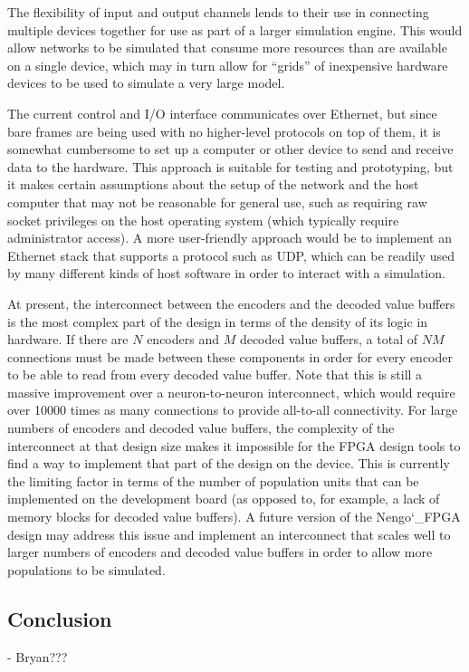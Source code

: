 \documentclass[english]{article}
\newcommand{\design}{Nengo\char`_FPGA}  %
\begin{document}
The flexibility of input and output channels lends to their use in connecting multiple devices together for use as part of a larger simulation engine.
This would allow networks to be simulated that consume more resources than are available on a single device, which may in turn allow
for ``grids'' of inexpensive hardware devices to be used to simulate a very large model.

The current control and I/O interface communicates over Ethernet, but since bare frames are being used with no higher-level protocols on top of them,
it is somewhat cumbersome to set up a computer or other device to send and receive data to the hardware.
This approach is suitable for testing and prototyping, but it makes certain assumptions about the setup of the network and the host computer that
may not be reasonable for general use, such as requiring raw socket privileges on the host operating system (which typically require administrator access).
A more user-friendly approach would be to implement an Ethernet stack that supports a protocol such as UDP, which can be readily used by many different
kinds of host software in order to interact with a simulation.

At present, the interconnect between the encoders and the decoded value
buffers is the most complex part of the design in terms of the density of its logic
in hardware. If there are $N$ encoders and $M$ decoded value buffers, a total of
$NM$ connections must be made between these components in order for every
encoder to be able to read from every decoded value buffer.
Note that this is still a massive improvement over a neuron-to-neuron interconnect,
which would require over 10000 times as many connections to provide all-to-all connectivity.
For large numbers of encoders and decoded value buffers, the complexity of the interconnect at
that design size makes it impossible for the FPGA design tools to find a way to
implement that part of the design on the device. This is currently the limiting
factor in terms of the number of population units that can be implemented on
the development board (as opposed to, for example, a lack of memory blocks for
decoded value buffers). A future version of the \design{} design may address
this issue and implement an interconnect that scales well to larger numbers of
encoders and decoded value buffers in order to allow more populations to be
simulated. %

\subsection{Conclusion}

- Bryan???



\end{document}
